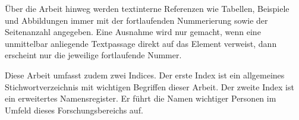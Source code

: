 Über die Arbeit hinweg werden textinterne Referenzen wie Tabellen, Beispiele und Abbildungen immer mit der fortlaufenden Nummerierung sowie der Seitenanzahl angegeben. Eine Ausnahme wird nur gemacht, wenn eine unmittelbar anliegende Textpassage direkt auf das Element verweist, dann erscheint nur die jeweilige fortlaufende Nummer.



Diese Arbeit umfasst zudem zwei Indices. Der erste Index ist ein allgemeines Stichwortverzeichnis mit wichtigen Begriffen dieser Arbeit. Der zweite Index ist ein erweitertes Namensregister. Er führt die Namen wichtiger Personen im Umfeld dieses Forschungsbereichs auf.
